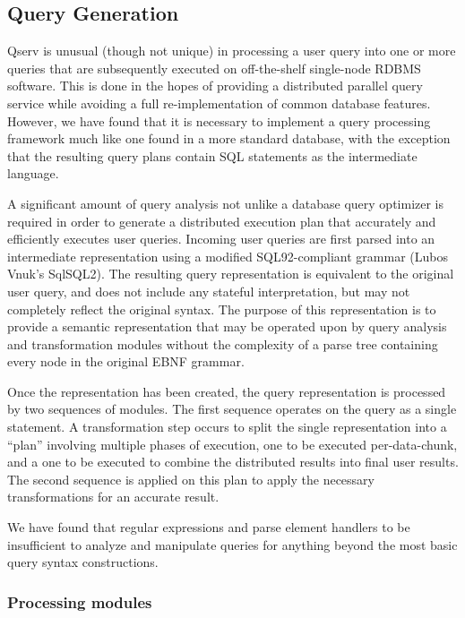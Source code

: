 \documentclass[DM,lsstdraft,toc]{lsstdoc}
\begin{document}
\subsection{Query Generation}\label{query-generation}

Qserv is unusual (though not unique) in processing a user query into one
or more queries that are subsequently executed on off-the-shelf
single-node RDBMS software. This is done in the hopes of providing a
distributed parallel query service while avoiding a full
re-implementation of common database features. However, we have found
that it is necessary to implement a query processing framework much like
one found in a more standard database, with the exception that the
resulting query plans contain SQL statements as the intermediate
language.

A significant amount of query analysis not unlike a database query
optimizer is required in order to generate a distributed execution plan
that accurately and efficiently executes user queries. Incoming user
queries are first parsed into an intermediate representation using a
modified SQL92-compliant grammar (Lubos Vnuk's SqlSQL2). The resulting
query representation is equivalent to the original user query, and does
not include any stateful interpretation, but may not completely reflect
the original syntax. The purpose of this representation is to provide a
semantic representation that may be operated upon by query analysis and
transformation modules without the complexity of a parse tree containing
every node in the original EBNF grammar.

Once the representation has been created, the query representation is
processed by two sequences of modules. The first sequence operates on
the query as a single statement. A transformation step occurs to split
the single representation into a ``plan'' involving multiple phases of
execution, one to be executed per-data-chunk, and a one to be executed
to combine the distributed results into final user results. The second
sequence is applied on this plan to apply the necessary transformations
for an accurate result.

We have found that regular expressions and parse element handlers to be
insufficient to analyze and manipulate queries for anything beyond the
most basic query syntax constructions.

\subsubsection{Processing modules}\label{processing-modules}
\end{document}
